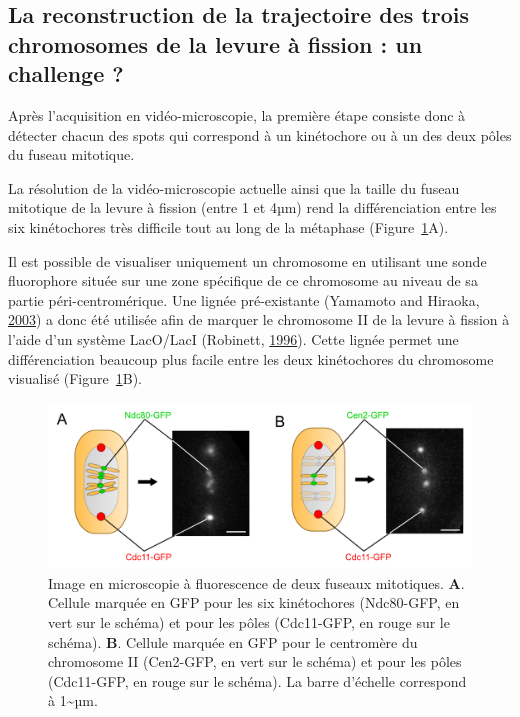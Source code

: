 \documentclass[12pt,a4paper,twoside,openright]{book}
\begin{document}
\subsection{La reconstruction de la trajectoire des trois chromosomes de
la levure à fission : un challenge
?}\label{la-reconstruction-de-la-trajectoire-des-trois-chromosomes-de-la-levure-uxe0-fission-un-challenge}

Après l'acquisition en vidéo-microscopie, la première étape consiste
donc à détecter chacun des spots qui correspond à un kinétochore ou à un
des deux pôles du fuseau mitotique.

La résolution de la vidéo-microscopie actuelle ainsi que la taille du
fuseau mitotique de la levure à fission (entre 1 et 4µm) rend la
différenciation entre les six kinétochores très difficile tout au long
de la métaphase (Figure~\ref{fig:spindle_peaks}A).

Il est possible de visualiser uniquement un chromosome en utilisant une
sonde fluorophore située sur une zone spécifique de ce chromosome au
niveau de sa partie péri-centromérique. Une lignée pré-existante
(Yamamoto and Hiraoka, \protect\hyperlink{ref-Yamamoto2003}{2003}) a
donc été utilisée afin de marquer le chromosome II de la levure à
fission à l'aide d'un système LacO/LacI (Robinett,
\protect\hyperlink{ref-Robinett1996}{1996}). Cette lignée permet une
différenciation beaucoup plus facile entre les deux kinétochores du
chromosome visualisé (Figure~\ref{fig:spindle_peaks}B).

\begin{figure}[htbp]
\centering
\includegraphics{figures/results/imaging/spindle_peaks.png}
\caption[Image en microscopie à fluorescence de deux fuseaux mitotique]{\label{fig:spindle_peaks}Image
en microscopie à fluorescence de deux fuseaux mitotiques. \textbf{A}.
Cellule marquée en GFP pour les six kinétochores (Ndc80-GFP, en vert sur
le schéma) et pour les pôles (Cdc11-GFP, en rouge sur le schéma).
\textbf{B}. Cellule marquée en GFP pour le centromère du chromosome II
(Cen2-GFP, en vert sur le schéma) et pour les pôles (Cdc11-GFP, en rouge
sur le schéma). La barre d'échelle correspond à 1\textasciitilde{}µm.}
\end{figure}
\end{document}
